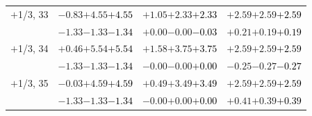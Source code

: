\documentclass[compress]{beamer}
\begin{document}
\begin{frame}
\begin{tabular}{r | c | c | c}
$+$1/3, 33 & $-0.83$\hspace{0.1 cm}$+4.55$\hspace{0.1 cm}\textcolor{black}{$+4.55$} & $+1.05$\hspace{0.1 cm}$+2.33$\hspace{0.1 cm}\textcolor{black}{$+2.33$} & $+2.59$\hspace{0.1 cm}$+2.59$\hspace{0.1 cm}\textcolor{black}{$+2.59$} \\
           & $-1.33$\hspace{0.1 cm}$-1.33$\hspace{0.1 cm}\textcolor{black}{$-1.34$} & $+0.00$\hspace{0.1 cm}$-0.00$\hspace{0.1 cm}\textcolor{black}{$-0.03$} & $+0.21$\hspace{0.1 cm}$+0.19$\hspace{0.1 cm}\textcolor{black}{$+0.19$} \\
$+$1/3, 34 & $+0.46$\hspace{0.1 cm}$+5.54$\hspace{0.1 cm}\textcolor{black}{$+5.54$} & $+1.58$\hspace{0.1 cm}$+3.75$\hspace{0.1 cm}\textcolor{black}{$+3.75$} & $+2.59$\hspace{0.1 cm}$+2.59$\hspace{0.1 cm}\textcolor{black}{$+2.59$} \\
           & $-1.33$\hspace{0.1 cm}$-1.33$\hspace{0.1 cm}\textcolor{black}{$-1.34$} & $-0.00$\hspace{0.1 cm}$-0.00$\hspace{0.1 cm}\textcolor{black}{$+0.00$} & $-0.25$\hspace{0.1 cm}$-0.27$\hspace{0.1 cm}\textcolor{black}{$-0.27$} \\
$+$1/3, 35 & $-0.03$\hspace{0.1 cm}$+4.59$\hspace{0.1 cm}\textcolor{black}{$+4.59$} & $+0.49$\hspace{0.1 cm}$+3.49$\hspace{0.1 cm}\textcolor{black}{$+3.49$} & $+2.59$\hspace{0.1 cm}$+2.59$\hspace{0.1 cm}\textcolor{black}{$+2.59$} \\
           & $-1.33$\hspace{0.1 cm}$-1.33$\hspace{0.1 cm}\textcolor{black}{$-1.34$} & $-0.00$\hspace{0.1 cm}$+0.00$\hspace{0.1 cm}\textcolor{black}{$+0.00$} & $+0.41$\hspace{0.1 cm}$+0.39$\hspace{0.1 cm}\textcolor{black}{$+0.39$} \\

\end{tabular}
\end{frame}
\end{document}
